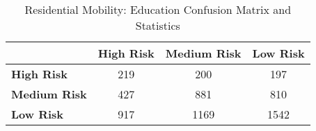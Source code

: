 \begin{table}[!htbp]
    \small
    \centering
    \caption{Residential Mobility: Education Confusion Matrix and Statistics}
    \label{tab:trans_edu_confusion}
    \begin{tabular}{lccc}
        \toprule
        & \textbf{High Risk} & \textbf{Medium Risk} & \textbf{Low Risk} \\
        \midrule
        \textbf{High Risk} & 219 & 200 & 197 \\
        \textbf{Medium Risk} & 427 & 881 & 810 \\
        \textbf{Low Risk} & 917 & 1169 & 1542 \\
        \bottomrule
     
    \end{tabular}
\end{table}